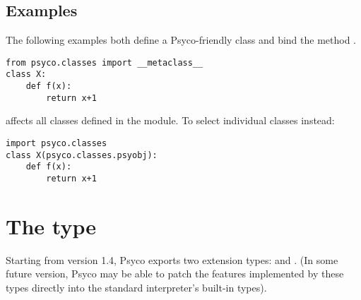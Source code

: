 \documentclass{manual}
\begin{document}
\subsection{Examples}

The following examples both define a Psyco-friendly class  and bind the method .

\begin{verbatim}
from psyco.classes import __metaclass__
class X:
    def f(x):
        return x+1
\end{verbatim}

 affects all classes defined in the module.  To select individual classes instead:

\begin{verbatim}
import psyco.classes
class X(psyco.classes.psyobj):
    def f(x):
        return x+1
\end{verbatim}


\section{The  type}\label{psycocompact}

Starting from version 1.4, Psyco exports two extension types:  and .  (In some future version, Psyco may be able to patch the features implemented by these types directly into the standard interpreter's built-in types).
\end{document}
